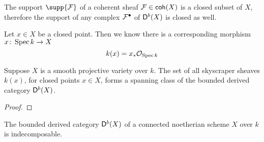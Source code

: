 \begin{remark}
    \label{supports closed}
    The support $\supp{\F}$ of a coherent sheaf $\mathcal F \in \mathsf{coh}(X)$ is a closed subset of $X$, therefore the support of any complex $\mathcal F^\bullet$ of $\mathsf{D}^b(X)$ is closed as well.
\end{remark}

Let $x \in X$ be a closed point. Then we know there is a corresponding morphism $x \colon \operatorname{Spec}k \to X$ 
\[
    k(x) = x_* \mathcal{O}_{\operatorname{Spec}k}
\]

\begin{proposition}
    Suppose $X$ is a smooth projective variety over $k$. The set of all skyscraper sheaves $k(x)$, for closed points $x \in X$, forms a spanning class of the bounded derived category $\mathsf{D}^b(X)$.
\end{proposition}

\begin{proof}
    
\end{proof}

\begin{theorem}
    The bounded derived category $\mathsf{D}^b(X)$ of a connected noetherian scheme $X$ over $k$ is indecomposable.
\end{theorem}

